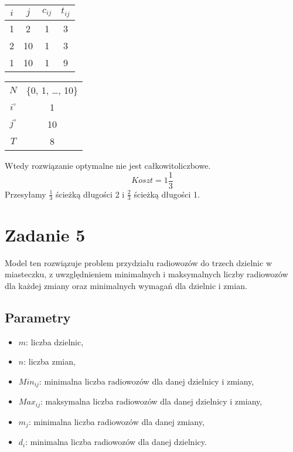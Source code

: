 \documentclass[12pt, letterpaper]{article}
\begin{document}
\begin{center}
  \begin{tabular}{|c|c|c|c|}
    \hline
    \( i \) & \( j \) & \( c_{ij} \) & \( t_{ij} \) \\
    \hline
    1       & 2       & 1            & 3            \\
    2       & 10      & 1            & 3            \\
    1       & 10      & 1            & 9            \\
    \hline
  \end{tabular}
\end{center}

\begin{center}
  \begin{tabular}{|c|c|}
    \hline
    \( N \)       & \{0, 1, \dots, 10\} \\
    \( i^\circ \) & 1                   \\
    \( j^\circ \) & 10                  \\
    \( T \)       & 8                   \\
    \hline
  \end{tabular}
\end{center}

Wtedy rozwiązanie optymalne nie jest całkowitoliczbowe.
\[ Koszt = 1 \frac{1}{3} \]
Przesyłamy $\frac{1}{3}$ ścieżką długości 2 i $\frac{2}{3}$ ścieżką długości 1.

\section{Zadanie 5}

Model ten rozwiązuje problem przydziału radiowozów do trzech dzielnic w
miasteczku, z uwzględnieniem minimalnych i maksymalnych liczby radiowozów dla
każdej zmiany oraz minimalnych wymagań dla dzielnic i zmian.

\subsection{Parametry}
\begin{itemize}
  \item \( m \): liczba dzielnic,
  \item \( n \): liczba zmian,
  \item \( Min_{ij} \): minimalna liczba radiowozów dla danej dzielnicy i
        zmiany,
  \item \( Max_{ij} \): maksymalna liczba radiowozów dla danej dzielnicy i
        zmiany,
  \item \( m_j \): minimalna liczba radiowozów dla danej zmiany,
  \item \( d_i \): minimalna liczba radiowozów dla danej dzielnicy.
\end{itemize}
\end{document}
